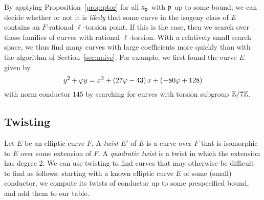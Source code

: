 \documentclass{amsart}
\begin{document}
By applying Proposition~\ref{prop:ptor} for all $a_{\mathfrak{p}}$ with $\mathfrak{p}$ up
to some bound, we can decide whether or not it is {\em likely} that
some curve in the isogeny class of $E$ contains an $F$-rational
$\ell$-torsion point. If this is the case, then we search over those
families of curves with rational $\ell$-torsion. With a relatively small
search space, we thus find many curves with large coefficients more
quickly than with the algorithm of Section~\ref{sec:naive}.
For example, we first found the curve $E$ given by 
$$y^2 + \varphi{}y = x^3 + \left(27 \varphi{} - 43\right)x + \left(-80 \varphi{} + 128\right) 
$$ with norm conductor $145$ by searching for curves with torsion subgroup $\mathbb{Z}/7\mathbb{Z}$.


\subsection{Twisting}

Let $E$ be an elliptic curve $F$. A \emph{twist} $E'$ of $E$ is a
curve over $F$ that is isomorphic to $E$ over some extension of $F$. A
\emph{quadratic twist} is a twist in which the extension has degree
$2$.  We can use twisting to find curves that may otherwise be
difficult to find as follows: starting with a known elliptic curve $E$
of some (small) conductor, we compute its twists of conductor up to
some prespecified bound, and add them to our table.
\end{document}
